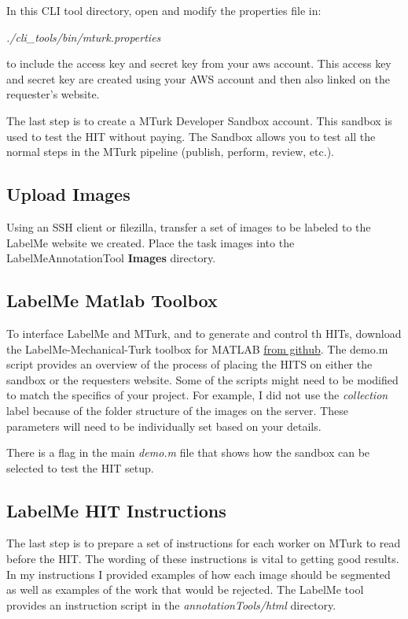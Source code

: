 \documentclass[a4paper]{article}
\begin{document}
In this CLI tool directory, open and modify the properties file in:

 \textit{./cli\_tools/bin/mturk.properties} 
 
 to include the access key and secret key from your aws account. This access key and secret key are created using your AWS account and then also linked on the requester's website. 

The last step is to create a MTurk Developer Sandbox account. This sandbox is used to test the HIT without paying. The Sandbox allows you to test all the normal steps in the MTurk pipeline (publish, perform, review, etc.). 

\subsection{Upload Images}
Using an SSH client or filezilla, transfer a set of images to be labeled to the LabelMe website we created. Place the task images into the LabelMeAnnotationTool \textbf{Images} directory. 

\subsection{LabelMe Matlab Toolbox}
To interface LabelMe and MTurk, and to generate and control th HITs, download the LabelMe-Mechanical-Turk toolbox for MATLAB \href{https://github.com/CSAILVision/LabelMeMechanicalTurk
}{from github}. The demo.m script provides an overview of the process of placing the HITS on either the sandbox or the requesters website. Some of the scripts might need to be modified to match the specifics of your project. For example, I did not use the \textit{collection} label because of the folder structure of the images on the server. These parameters will need to be individually set based on your details.

There is a flag in the main \textit{demo.m} file that shows how the sandbox can be selected to test the HIT setup. 

\subsection{LabelMe HIT Instructions}
The last step is to prepare a set of instructions for each worker on MTurk to read before the HIT. The wording of these instructions is vital to getting good results. In my instructions I provided examples of how each image should be segmented as well as examples of the work that would be rejected. The LabelMe tool provides an instruction script in the \textit{annotationTools/html} directory. 
\end{document}
